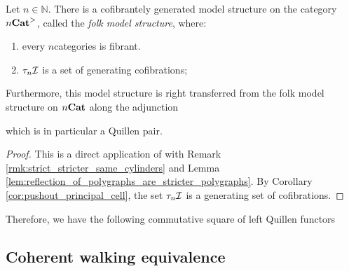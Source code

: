 \begin{thm} \label{thm:folk_model_structure_on_stricter_n}
    Let \( n \in \mathbb{N} \).
    There is a cofibrantely generated model structure on the category \( {n\mathbf{Cat}}^> \), called the \emph{folk model structure}, where:
    \begin{enumerate}
        \item every \( n \)\nbd categories is fibrant.
        \item \( \tau_{n}\mathcal{I} \) is a set of generating cofibrations;
    \end{enumerate}
    Furthermore, this model structure is right transferred from the folk model structure on \( {n\mathbf{Cat}} \) along the adjunction 
    \begin{center}
    \end{center}
    which is in particular a Quillen pair.
\end{thm}
\begin{proof}
    This is a direct application of \cite[Proposition 21.3.2]{ara2025polygraphs} with Remark \ref{rmk:strict_stricter_same_cylinders} and Lemma \ref{lem:reflection_of_polygraphs_are_stricter_polygraphs}.
    By Corollary \ref{cor:pushout_principal_cell}, the set \( \tau_{n}\mathcal{I} \) is a generating set of cofibrations.
\end{proof}

\noindent Therefore, we have the following commutative square of left Quillen functors
\begin{center}
\end{center}

\subsection{Coherent walking equivalence}

